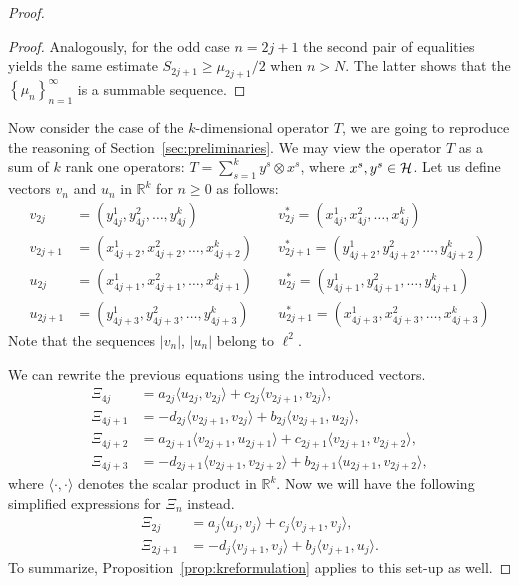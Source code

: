 \begin{proof}
\begin{proof}
        Analogously, for the odd case $n = 2j+1$ the second pair of equalities yields
          the same estimate $S_{2j+1} \geq \mu_{2j+1}/2$ when $n > N$.
        The latter shows that the $\left\{\mu_n\right\}_{n=1}^\infty$ is a summable sequence.
      \end{proof}
      Now consider the case of the $k$-dimensional operator $T$, we are going to reproduce the reasoning of Section~\ref{sec:preliminaries}.
      We may view the operator $T$ as a sum of $k$ rank one operators: $T = \sum_{s=1}^k y^s \otimes x^s$, where $x^s, y^s \in \cal{H}$.
      Let us define vectors $v_n$ and $u_n$ in $\mathbb{R}^k$ for $n \geq 0 $ as follows:
      \begin{align*}
        v_{2j} &= (y^1_{4j}, y^2_{4j}, \dots ,y^k_{4j}) \quad
        &v^*_{2j} = (x^1_{4j}, x^2_{4j}, \dots ,x^k_{4j}) \\
        v_{2j+1} &= (x^1_{4j+2}, x^2_{4j+2}, \dots ,x^k_{4j+2}) \quad
        &v^*_{2j+1} = (y^1_{4j+2}, y^2_{4j+2}, \dots ,y^k_{4j+2}) \\
        u_{2j} &= (x^1_{4j+1}, x^2_{4j+1}, \dots ,x^k_{4j+1}) \quad
        &u^*_{2j} = (y^1_{4j+1}, y^2_{4j+1}, \dots ,y^k_{4j+1}) \\
        u_{2j+1} &= (y^1_{4j+3}, y^2_{4j+3}, \dots ,y^k_{4j+3}) \quad
        &u^*_{2j+1} = (x^1_{4j+3}, x^2_{4j+3}, \dots ,x^k_{4j+3})
      \end{align*}
      Note that the sequences $\lvert v_n \rvert$, $\lvert u_n \rvert$ belong to $\ell^2$.

      We can rewrite the previous equations using the introduced vectors.
      \begin{align*}
        \Xi_{4j} &= a_{2j} \langle u_{2j}, v_{2j}\rangle + c_{2j} \langle v_{2j+1}, v_{2j}\rangle,\\
        \Xi_{4j + 1} &= -d_{2j} \langle v_{2j+1}, v_{2j}\rangle + b_{2j} \langle v_{2j+1}, u_{2j}\rangle,\\
        \Xi_{4j + 2} &= a_{2j+1} \langle v_{2j+1}, u_{2j+1} \rangle + c_{2j+1} \langle v_{2j+1}, v_{2j+2} \rangle,\\
        \Xi_{4j + 3} &= -d_{2j+1} \langle v_{2j+1}, v_{2j+2}\rangle + b_{2j+1} \langle u_{2j+1}, v_{2j+2} \rangle,
      \end{align*}
        where $\langle\cdot, \cdot\rangle$ denotes the scalar product in $\mathbb{R}^k$.
      Now we will have the following simplified expressions for $\Xi_n$ instead.
      \begin{align*}
        \Xi_{2j} &= a_{j} \langle u_{j}, v_{j} \rangle  + c_{j} \langle v_{j+1}, v_{j} \rangle,\\
        \Xi_{2j + 1} &= -d_{j} \langle v_{j+1}, v_{j} \rangle + b_{j} \langle v_{j+1}, u_{j}\rangle.
      \end{align*}
      To summarize, Proposition~\ref{prop:kreformulation} applies to this set-up as well.


\end{proof}
